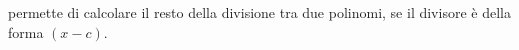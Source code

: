 permette di calcolare il resto della divisione tra due polinomi,
se il divisore è della forma $(x-c)$.

